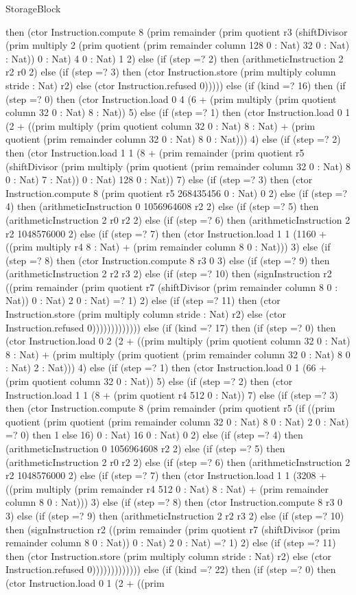 \begin{lexlean}{StorageBlock}
\begin{semanticmodule}
{then (ctor Instruction.compute 8 (prim remainder (prim quotient r3 (shiftDivisor (prim multiply 2 (prim quotient (prim remainder column 128 0 : Nat) 32 0 : Nat) : Nat)) 0 : Nat) 4 0 : Nat) 1 2) else (if (step =? 2) then (arithmeticInstruction 2 r2 r0 2) else (if (step =? 3) then (ctor Instruction.store (prim multiply column stride : Nat) r2) else (ctor Instruction.refused 0))))) else (if (kind =? 16) then (if (step =? 0) then (ctor Instruction.load 0 4 (6 + (prim multiply (prim quotient column 32 0 : Nat) 8 : Nat)) 5) else (if (step =? 1) then (ctor Instruction.load 0 1 (2 + ((prim multiply (prim quotient column 32 0 : Nat) 8 : Nat) + (prim quotient (prim remainder column 32 0 : Nat) 8 0 : Nat))) 4) else (if (step =? 2) then (ctor Instruction.load 1 1 (8 + (prim remainder (prim quotient r5 (shiftDivisor (prim multiply (prim quotient (prim remainder column 32 0 : Nat) 8 0 : Nat) 7 : Nat)) 0 : Nat) 128 0 : Nat)) 7) else (if (step =? 3) then (ctor Instruction.compute 8 (prim quotient r5 268435456 0 : Nat) 0 2) else (if (step =? 4) then (arithmeticInstruction 0 1056964608 r2 2) else (if (step =? 5) then (arithmeticInstruction 2 r0 r2 2) else (if (step =? 6) then (arithmeticInstruction 2 r2 1048576000 2) else (if (step =? 7) then (ctor Instruction.load 1 1 (1160 + ((prim multiply r4 8 : Nat) + (prim remainder column 8 0 : Nat))) 3) else (if (step =? 8) then (ctor Instruction.compute 8 r3 0 3) else (if (step =? 9) then (arithmeticInstruction 2 r2 r3 2) else (if (step =? 10) then (signInstruction r2 ((prim remainder (prim quotient r7 (shiftDivisor (prim remainder column 8 0 : Nat)) 0 : Nat) 2 0 : Nat) =? 1) 2) else (if (step =? 11) then (ctor Instruction.store (prim multiply column stride : Nat) r2) else (ctor Instruction.refused 0))))))))))))) else (if (kind =? 17) then (if (step =? 0) then (ctor Instruction.load 0 2 (2 + ((prim multiply (prim quotient column 32 0 : Nat) 8 : Nat) + (prim multiply (prim quotient (prim remainder column 32 0 : Nat) 8 0 : Nat) 2 : Nat))) 4) else (if (step =? 1) then (ctor Instruction.load 0 1 (66 + (prim quotient column 32 0 : Nat)) 5) else (if (step =? 2) then (ctor Instruction.load 1 1 (8 + (prim quotient r4 512 0 : Nat)) 7) else (if (step =? 3) then (ctor Instruction.compute 8 (prim remainder (prim quotient r5 (if ((prim quotient (prim quotient (prim remainder column 32 0 : Nat) 8 0 : Nat) 2 0 : Nat) =? 0) then 1 else 16) 0 : Nat) 16 0 : Nat) 0 2) else (if (step =? 4) then (arithmeticInstruction 0 1056964608 r2 2) else (if (step =? 5) then (arithmeticInstruction 2 r0 r2 2) else (if (step =? 6) then (arithmeticInstruction 2 r2 1048576000 2) else (if (step =? 7) then (ctor Instruction.load 1 1 (3208 + ((prim multiply (prim remainder r4 512 0 : Nat) 8 : Nat) + (prim remainder column 8 0 : Nat))) 3) else (if (step =? 8) then (ctor Instruction.compute 8 r3 0 3) else (if (step =? 9) then (arithmeticInstruction 2 r2 r3 2) else (if (step =? 10) then (signInstruction r2 ((prim remainder (prim quotient r7 (shiftDivisor (prim remainder column 8 0 : Nat)) 0 : Nat) 2 0 : Nat) =? 1) 2) else (if (step =? 11) then (ctor Instruction.store (prim multiply column stride : Nat) r2) else (ctor Instruction.refused 0))))))))))))) else (if (kind =? 22) then (if (step =? 0) then (ctor Instruction.load 0 1 (2 + ((prim }
\end{semanticmodule}
\end{lexlean}
